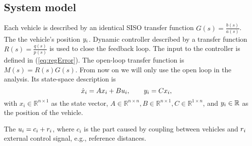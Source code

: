 \documentclass[technote, 10pt, twoside]{IEEEtran}
\newcommand{\relCoupling}{c}
\newcommand{\contNumCoef}{q}
\newcommand{\contDenCoef}{p}
\newcommand{\vehNumCoef}{b}
\newcommand{\vehDenCoef}{a}
\newcommand{\lapDom}{s}
\newcommand{\vehicleTf}{G}
\newcommand{\controllerTf}{R}
\newcommand{\openLoop}{M}
\newcommand{\olOrd}{n}
\newcommand{\stateVect}{{x}}
\newcommand{\outVect}{{\pos}}
\newcommand{\matAi}{{A}}
\newcommand{\matBi}{{B}}
\newcommand{\matCi}{{C}}
\theoremstyle{plain}
\theoremstyle{definition}
\theoremstyle{assump}
\begin{document}
\subsection{System model}
Each vehicle is described by an identical SISO transfer function
$\vehicleTf(\lapDom) = \frac{\vehNumCoef(\lapDom)}{\vehDenCoef({\lapDom})}$. The
 the vehicle's
position $y_i$. Dynamic controller described by a transfer function
$\controllerTf(\lapDom) = \frac{\contNumCoef(\lapDom)}{\contDenCoef(\lapDom)}$
is used to close the feedback loop. The input to the controller is defined in
(\ref{eq:regError}). The open-loop transfer function is
$\openLoop(\lapDom)=\controllerTf(\lapDom)\vehicleTf(\lapDom)$. From now on we
will only use the open loop in the analysis. Its state-space description is
\begin{equation}
	\dot{\stateVect}_i = \matAi \stateVect_i + \matBi \totalInput_i, \qquad  \outVect_i = \matCi \stateVect_i,
\end{equation}
with $\stateVect_i \in \mathbb{R}^{\olOrd \times 1}$ as the state vector,
$\matAi \in \mathbb{R}^{\olOrd\times \olOrd}, \matBi \in \mathbb{R}^{\olOrd \times 1}, \matCi \in \mathbb{R}^{1 \times \olOrd}$, and $y_i \in \mathbb{R}$ as the position of the vehicle.

The  $\totalInput_i=\relCoupling_i+\inp_i$, where
$\relCoupling_i$ is the part caused by coupling between vehicles and $r_i$
external control signal, e.g., reference distances. 
\end{document}

